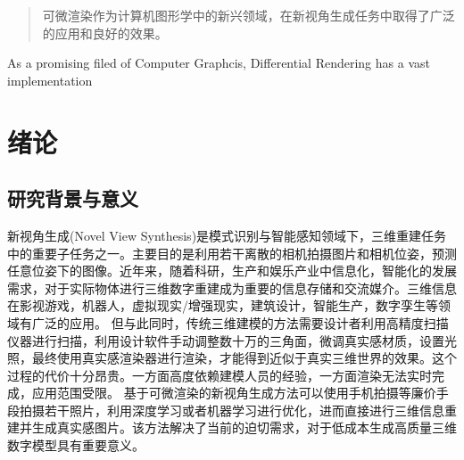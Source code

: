 \documentclass[master,oneside,winfonts]{njuthesis/njuthesis}
\author{朱子航}
\institute{南京大学}
\date{2023年5月13日}
\begin{document}
\maketitle
\makeenglishtitle
{}
\begin{spacing}{1.25}
    \begin{abstract}
        可微渲染作为计算机图形学中的新兴领域，在新视角生成任务中取得了广泛的应用和良好的效果。
    \end{abstract}
\end{spacing}

\begin{spacing}{1.15}
    \begin{englishabstract}
        As a promising filed of Computer Graphcis, Differential Rendering has a vast implementation
    \end{englishabstract}
\end{spacing}
\begin{spacing}{1}
    \renewcommand*\contentsname{目录}
    \tableofcontents
\end{spacing}

\mainmatter

\chapter{绪论}\label{chapter_introduction}

\section{研究背景与意义}
新视角生成(Novel View Synthesis)是模式识别与智能感知领域下，三维重建任务中的重要子任务之一。主要目的是利用若干离散的相机拍摄图片和相机位姿，预测任意位姿下的图像。近年来，随着科研，生产和娱乐产业中信息化，智能化的发展需求，对于实际物体进行三维数字重建成为重要的信息存储和交流媒介。三维信息在影视游戏，机器人，虚拟现实/增强现实，建筑设计，智能生产，数字孪生等领域有广泛的应用。
但与此同时，传统三维建模的方法需要设计者利用高精度扫描仪器进行扫描，利用设计软件手动调整数十万的三角面，微调真实感材质，设置光照，最终使用真实感渲染器进行渲染，才能得到近似于真实三维世界的效果。这个过程的代价十分昂贵。一方面高度依赖建模人员的经验，一方面渲染无法实时完成，应用范围受限。
基于可微渲染的新视角生成方法可以使用手机拍摄等廉价手段拍摄若干照片，利用深度学习或者机器学习进行优化，进而直接进行三维信息重建并生成真实感图片。该方法解决了当前的迫切需求，对于低成本生成高质量三维数字模型具有重要意义。
\end{document}
